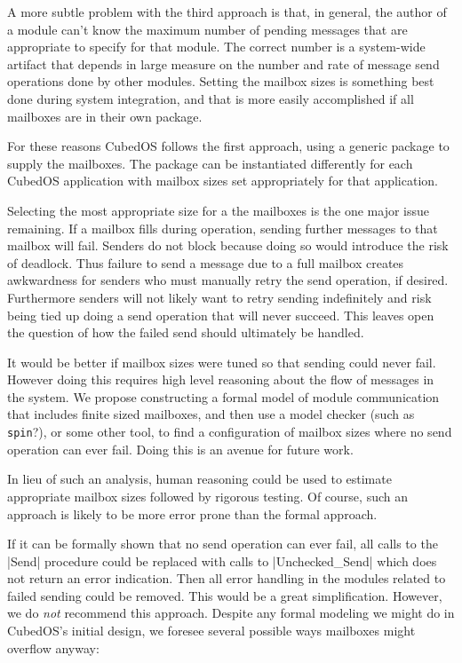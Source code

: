 A more subtle problem with the third approach is that, in general, the author of a module can't
know the maximum number of pending messages that are appropriate to specify for that module. The
correct number is a system-wide artifact that depends in large measure on the number and rate of
message send operations done by other modules. Setting the mailbox sizes is something best done
during system integration, and that is more easily accomplished if all mailboxes are in their
own package.

For these reasons CubedOS follows the first approach, using a generic package to supply the
mailboxes. The package can be instantiated differently for each CubedOS application with mailbox
sizes set appropriately for that application.

Selecting the most appropriate size for a the mailboxes is the one major issue remaining. If a
mailbox fills during operation, sending further messages to that mailbox will fail. Senders do
not block because doing so would introduce the risk of deadlock. Thus failure to send a message
due to a full mailbox creates awkwardness for senders who must manually retry the send
operation, if desired. Furthermore senders will not likely want to retry sending indefinitely
and risk being tied up doing a send operation that will never succeed. This leaves open the
question of how the failed send should ultimately be handled.

It would be better if mailbox sizes were tuned so that sending could never fail. However doing
this requires high level reasoning about the flow of messages in the system. We propose
constructing a formal model of module communication that includes finite sized mailboxes, and
then use a model checker (such as \texttt{spin}?), or some other tool, to find a configuration
of mailbox sizes where no send operation can ever fail. Doing this is an avenue for future work.

In lieu of such an analysis, human reasoning could be used to estimate appropriate mailbox sizes
followed by rigorous testing. Of course, such an approach is likely to be more error prone than
the formal approach.

If it can be formally shown that no send operation can ever fail, all calls to the |Send|
procedure could be replaced with calls to |Unchecked_Send| which does not return an error
indication. Then all error handling in the modules related to failed sending could be removed.
This would be a great simplification. However, we do \emph{not} recommend this approach. Despite
any formal modeling we might do in CubedOS's initial design, we foresee several possible ways
mailboxes might overflow anyway:

